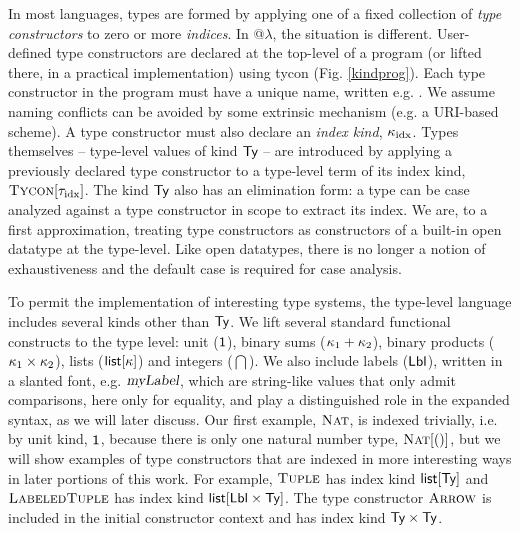 \documentclass[9pt,preprint]{sigplanconf}
\begin{document}
In most languages, types are formed by applying one of a fixed collection of \emph{type constructors} to zero or more \emph{indices}. In @$\lambda$, the situation is different. User-defined type constructors are declared at the top-level of a program (or lifted there, in a practical implementation) using \textsf{tycon} (Fig. \ref{kindprog}). Each type constructor in the program must have a unique name, written e.g. . We assume naming conflicts can be avoided by some extrinsic mechanism (e.g. a URI-based scheme). A type constructor must also declare an \emph{index kind}, $\kappa_{\text{idx}}$. Types themselves -- type-level values of kind $\textsf{Ty}$ -- are introduced by applying a previously declared type constructor to a type-level term of its index kind, $\textsc{Tycon}[{\tau_{\text{idx}}}]$. The kind $\textsf{Ty}$ also has an elimination form: a type can be case analyzed against a type constructor in scope to extract its index. We are, to a first approximation, treating type constructors as constructors of a built-in open datatype at the type-level. Like open datatypes, there is no longer a notion of exhaustiveness and the default case is required for case analysis.

 To permit the implementation of interesting type systems, the type-level language includes several kinds other than $\textsf{Ty}$. We lift several  standard functional constructs to the type level: unit ($\textsf{1}$), binary sums ($\kappa_1 + \kappa_2$), binary products ($\kappa_1 \times \kappa_2$), lists ($\textsf{list}[\kappa]$) and integers ($\dint$). We also include labels ($\textsf{Lbl}$), written in a slanted font, e.g. $\textsl{myLabel}$, which are string-like values that only admit comparisons, here only for equality, and play a distinguished role in the expanded syntax, as we will later discuss. Our first example, $\textsc{Nat}$, is indexed trivially, i.e. by unit kind, $\textsf{1}$, because there is only one natural number type, $\textsc{Nat}[()]$, but we will show examples of type constructors that are indexed in more interesting ways in later portions of this work. For example, $\textsc{Tuple}$ has index kind $\textsf{list}[\textsf{Ty}]$ and $\textsc{LabeledTuple}$ has index kind $\textsf{list}[\textsf{Lbl} \times \textsf{Ty}]$. The type constructor $\textsc{Arrow}$ is included in the initial constructor context and has index kind $\textsf{Ty} \times \textsf{Ty}$. 
\end{document}
